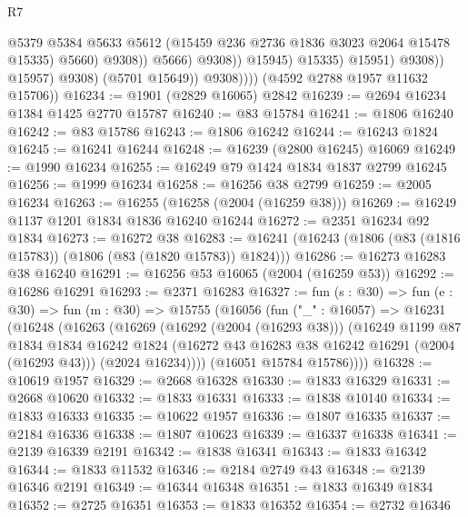 \begin{lexlean}{R7}
\begin{coremodule}
                                          @5379
                                          @5384
                                          @5633
                                          @5612
                                          (@15459 @236 @2736 @1836 @3023 @2064 @15478 @15335)
                                          @5660)
                                        @9308))
                                    @5666)
                                  @9308))
                              @15945)
                            @15335)
                          @15951)
                        @9308))
                    @15957)
                  @9308)
                (@5701 @15649))
              @9308))))
      (@4592 @2788 @1957 @11632 @15706))
@16234 := @1901 (@2829 @16065) @2842
@16239 := @2694 @16234 @1384 @1425 @2770 @15787
@16240 := @83 @15784
@16241 := @1806 @16240
@16242 := @83 @15786
@16243 := @1806 @16242
@16244 := @16243 @1824
@16245 := @16241 @16244
@16248 := @16239 (@2800 @16245) @16069
@16249 := @1990 @16234
@16255 := @16249 @79 @1424 @1834 @1837 @2799 @16245
@16256 := @1999 @16234
@16258 := @16256 @38 @2799
@16259 := @2005 @16234
@16263 := @16255 (@16258 (@2004 (@16259 @38)))
@16269 := @16249 @1137 @1201 @1834 @1836 @16240 @16244
@16272 := @2351 @16234 @92 @1834
@16273 := @16272 @38
@16283 := @16241 (@16243 (@1806 (@83 (@1816 @15783)) (@1806 (@83 (@1820 @15783)) @1824)))
@16286 := @16273 @16283 @38 @16240
@16291 := @16256 @53 @16065 (@2004 (@16259 @53))
@16292 := @16286 @16291
@16293 := @2371 @16283
@16327 := fun (s : @30) =>
  fun (e : @30) =>
  fun (m : @30) =>
  @15755
    (@16056
      (fun ("_" : @16057) =>
      @16231
        (@16248
          (@16263
            (@16269
              (@16292 (@2004 (@16293 @38)))
              (@16249
                @1199
                @87
                @1834
                @1834
                @16242
                @1824
                (@16272 @43 @16283 @38 @16242 @16291 (@2004 (@16293 @43)))
                (@2024 @16234))))
          (@16051 @15784 @15786))))
@16328 := @10619 @1957
@16329 := @2668 @16328
@16330 := @1833 @16329
@16331 := @2668 @10620
@16332 := @1833 @16331
@16333 := @1838 @10140
@16334 := @1833 @16333
@16335 := @10622 @1957
@16336 := @1807 @16335
@16337 := @2184 @16336
@16338 := @1807 @10623
@16339 := @16337 @16338
@16341 := @2139 @16339 @2191
@16342 := @1838 @16341
@16343 := @1833 @16342
@16344 := @1833 @11532
@16346 := @2184 @2749 @43
@16348 := @2139 @16346 @2191
@16349 := @16344 @16348
@16351 := @1833 @16349 @1834
@16352 := @2725 @16351
@16353 := @1833 @16352
@16354 := @2732 @16346

\end{coremodule}
\end{lexlean}
